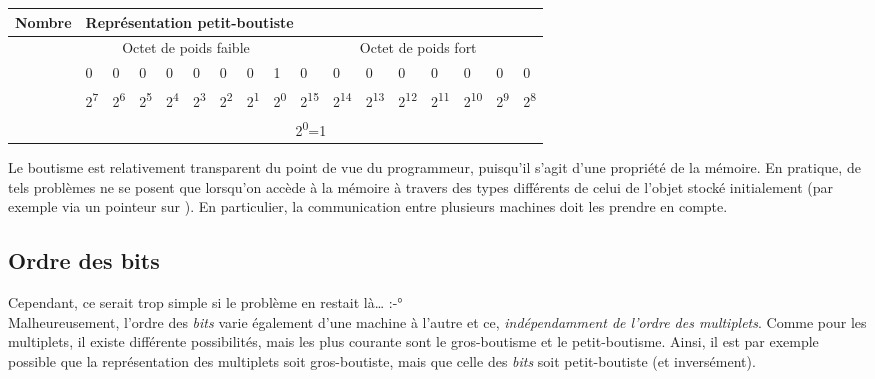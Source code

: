 \begin{table}
\centering
\begin{tabular}{|l|l|l|l|l|l|l|l|l|l|l|l|l|l|l|l|l|}\hline
\rowcolor{gris-tab-entete}\footnotesize \bf Nombre& \multicolumn{16}{l|}{\footnotesize \bf Représentation petit-boutiste}\\
 \hline
  \rowcolor{gris-clair-tab}\multirow{4}{2cm}{1} &\multicolumn{8}{c|}{Octet de poids faible}&\multicolumn{8}{c|}{Octet de poids fort}\\
  & 0 & 0 & 0 & 0 & 0 & 0 & 0 & 1 & 0 & 0 & 0 & 0 & 0 & 0 & 0 & 0 \\ 
  \cline{2-17}
    &2\textsuperscript{7}&2\textsuperscript{6}&2\textsuperscript{5}&2\textsuperscript{4}&2\textsuperscript{3}&2\textsuperscript{2}&2\textsuperscript{1}&2\textsuperscript{0}&2\textsuperscript{15}&2\textsuperscript{14}&2\textsuperscript{13}&2\textsuperscript{12}&2\textsuperscript{11}&2\textsuperscript{10}&2\textsuperscript{9}&2\textsuperscript{8}\\ 
  \cline{2-17}
     \rowcolor{gris-clair-tab}&\multicolumn{16}{c|}{2\textsuperscript{0}=1}\\ 
  \hline
  \end{tabular}
\end{table}

\begin{infobox} 
 Le boutisme est relativement
transparent du point de vue du programmeur, puisqu'il s'agit d'une
propriété de la mémoire. En pratique, de tels problèmes ne se posent que
lorsqu'on accède à la mémoire à travers des types différents de celui de
l'objet stocké initialement (par exemple via un pointeur sur
). En particulier, la communication entre plusieurs
machines doit les prendre en compte.
\end{infobox}


\subsection{Ordre des bits}
\label{ordre-des-bits}

Cependant, ce serait trop simple si le problème en restait là\ldots{}
:-°\\
Malheureusement, l'ordre des \emph{bits} varie également d'une machine à
l'autre et ce, \emph{indépendamment de l'ordre des multiplets}. Comme
pour les multiplets, il existe différente possibilités, mais les plus
courante sont le gros-boutisme et le petit-boutisme. Ainsi, il est par
exemple possible que la représentation des multiplets soit
gros-boutiste, mais que celle des \emph{bits} soit petit-boutiste (et
inversément).

